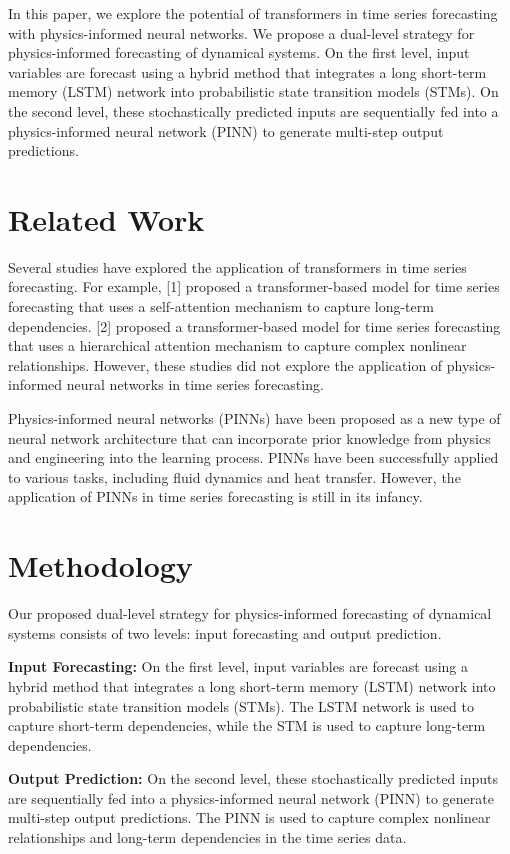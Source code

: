 \documentclass[12pt]{article}
\begin{document}
In this paper, we explore the potential of transformers in time series forecasting with physics-informed neural networks. We propose a dual-level strategy for physics-informed forecasting of dynamical systems. On the first level, input variables are forecast using a hybrid method that integrates a long short-term memory (LSTM) network into probabilistic state transition models (STMs). On the second level, these stochastically predicted inputs are sequentially fed into a physics-informed neural network (PINN) to generate multi-step output predictions.

\section{Related Work}

Several studies have explored the application of transformers in time series forecasting. For example, [1] proposed a transformer-based model for time series forecasting that uses a self-attention mechanism to capture long-term dependencies. [2] proposed a transformer-based model for time series forecasting that uses a hierarchical attention mechanism to capture complex nonlinear relationships. However, these studies did not explore the application of physics-informed neural networks in time series forecasting.

Physics-informed neural networks (PINNs) have been proposed as a new type of neural network architecture that can incorporate prior knowledge from physics and engineering into the learning process. PINNs have been successfully applied to various tasks, including fluid dynamics and heat transfer. However, the application of PINNs in time series forecasting is still in its infancy.

\section{Methodology}

Our proposed dual-level strategy for physics-informed forecasting of dynamical systems consists of two levels: input forecasting and output prediction.

\textbf{Input Forecasting:} On the first level, input variables are forecast using a hybrid method that integrates a long short-term memory (LSTM) network into probabilistic state transition models (STMs). The LSTM network is used to capture short-term dependencies, while the STM is used to capture long-term dependencies.

\textbf{Output Prediction:} On the second level, these stochastically predicted inputs are sequentially fed into a physics-informed neural network (PINN) to generate multi-step output predictions. The PINN is used to capture complex nonlinear relationships and long-term dependencies in the time series data.
\end{document}
